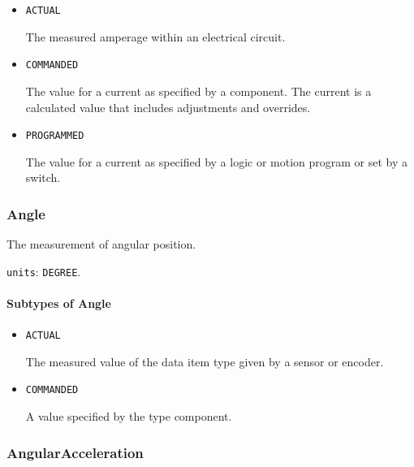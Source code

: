 \begin{itemize}

\item \texttt{ACTUAL}


The measured amperage within an electrical circuit.

\item \texttt{COMMANDED}


The value for a current as specified by a component. 
The  current is a calculated value that includes adjustments and overrides.

\item \texttt{PROGRAMMED}


The value for a current as specified by a logic or motion program or set by a switch.


\end{itemize}






\subsubsection{Angle}
\label{sec:Angle}



The measurement of angular position.


\texttt{units}: \texttt{DEGREE}.

\paragraph{Subtypes of Angle}\mbox{}
\label{sec:Subtypes of Angle}

\begin{itemize}

\item \texttt{ACTUAL}


The measured value of the data item type given by a sensor or encoder.

\item \texttt{COMMANDED}


A value specified by the  type component.


\end{itemize}





\subsubsection{AngularAcceleration}
\label{sec:AngularAcceleration}



